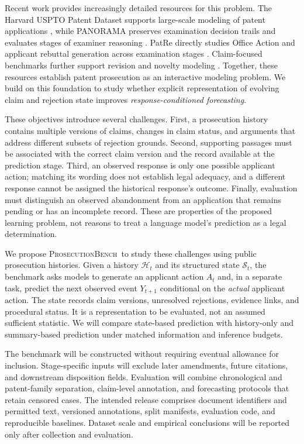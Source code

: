 \documentclass[11pt]{article}
\newcommand{\bench}{\textsc{ProsecutionBench}}
\newcommand{\hist}{\mathcal{H}}
\newcommand{\state}{\mathcal{S}}
\begin{document}
Recent work provides increasingly detailed resources for this problem. The Harvard USPTO Patent Dataset supports large-scale modeling of patent applications \citep{suzgun2023hupd}, while PANORAMA preserves examination decision trails and evaluates stages of examiner reasoning \citep{lim2025panorama}. PatRe directly studies Office Action and applicant rebuttal generation across examination stages \citep{wang2026patre}. Claim-focused benchmarks further support revision and novelty modeling \citep{jiang2024patentcr,lee2024patentedits}. Together, these resources establish patent prosecution as an interactive modeling problem. We build on this foundation to study whether explicit representation of evolving claim and rejection state improves \emph{response-conditioned forecasting}.

These objectives introduce several challenges. First, a prosecution history contains multiple versions of claims, changes in claim status, and arguments that address different subsets of rejection grounds. Second, supporting passages must be associated with the correct claim version and the record available at the prediction stage. Third, an observed response is only one possible applicant action; matching its wording does not establish legal adequacy, and a different response cannot be assigned the historical response's outcome. Finally, evaluation must distinguish an observed abandonment from an application that remains pending or has an incomplete record. These are properties of the proposed learning problem, not reasons to treat a language model's prediction as a legal determination.

We propose \bench\ to study these challenges using public prosecution histories. Given a history $\hist_t$ and its structured state $\state_t$, the benchmark asks models to generate an applicant action $A_t$ and, in a separate task, predict the next observed event $Y_{t+1}$ conditional on the \emph{actual} applicant action. The state records claim versions, unresolved rejections, evidence links, and procedural status. It is a representation to be evaluated, not an assumed sufficient statistic. We will compare state-based prediction with history-only and summary-based prediction under matched information and inference budgets.

The benchmark will be constructed without requiring eventual allowance for inclusion. Stage-specific inputs will exclude later amendments, future citations, and downstream disposition fields. Evaluation will combine chronological and patent-family separation, claim-level annotation, and forecasting protocols that retain censored cases. The intended release comprises document identifiers and permitted text, versioned annotations, split manifests, evaluation code, and reproducible baselines. Dataset scale and empirical conclusions will be reported only after collection and evaluation.
\end{document}
